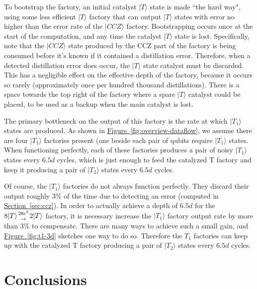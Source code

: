 \documentclass[twocolumn,accepted=2019-03-30]{quantumarticle}
\renewcommand{\sec}[1]{\hyperref[sec:#1]{Section~\ref*{sec:#1}}}
\newcommand{\fig}[1]{\hyperref[fig:#1]{Figure~\ref*{fig:#1}}}
\newcommand{\factory}[3]{$#1 \genfrac{}{}{0pt}{}{#2}{\rightarrow} {#3}$ factory}
\begin{document}
To bootstrap the factory, an initial catalyst $|T\rangle$ state is made ``the hard way", using some less efficient $|T\rangle$ factory that can output $|T\rangle$ states with error no higher than the error rate of the $|CCZ\rangle$ factory.
Bootstrapping occurs once at the start of the computation, and any time the catalyst $|T\rangle$ state is lost.
Specifically, note that the $|CCZ\rangle$ state produced by the CCZ part of the factory is being consumed before it's known if it contained a distillation error.
Therefore, when a detected distillation error does occur, the $|T\rangle$ state catalyst must be discarded.
This has a negligible effect on the effective depth of the factory, because it occurs so rarely (approximately once per hundred thousand distillations).
There is a space towards the top right of the factory where a spare $|T\rangle$ catalyst could be placed, to be used as a backup when the main catalyst is lost.

The primary bottleneck on the output of this factory is the rate at which $|T_1\rangle$ states are produced.
As shown in \fig{overview-dataflow}, we assume there are four $|T_1\rangle$ factories present (one beside each pair of qubits require $|T_1\rangle$ states.
When functioning perfectly, each of these factories produces a pair of noisy $|T_1\rangle$ states every $6.5d$ cycles, which is just enough to feed the catalyzed T factory and keep it producing a pair of $|T_2\rangle$ states every $6.5d$ cycles.

Of course, the $|T_1\rangle$ factories do not always function perfectly.
They discard their output roughly 3\% of the time due to detecting an error (computed in \sec{ccz}).
In order to actually achieve a depth of $6.5d$ for the \factory{8|T\rangle}{28\epsilon^2}{2|T\rangle}, it is necessary increase the $|T_1\rangle$ factory output rate by more than 3\% to compensate.
There are many ways to achieve such a small gain, and \fig{t1-3d} sketches one way to do so.
Therefore the $T_1$ factories can keep up with the catalyzed T factory producing a pair of $|T_2\rangle$ states every $6.5d$ cycles.




\section{Conclusions}
\label{sec:conclusion}
\end{document}
